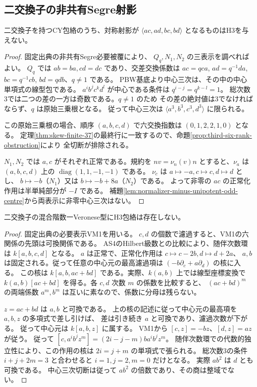 \subsection{二交換子の非共有Segre射影}
\begin{proposition}\label{prop:cubic-CY-two-disjoint-Segre-empty}
二交換子を持つCY包絡のうち、対称射影が
$\langle ac,ad,bc,bd\rangle$ となるものはH3を与えない。
\end{proposition}
\begin{proof}
固定出典\cite{AS4CYpinned}の非共有Segre必要被覆により、
$Q_q,N_1,N_2$ の三表示を調べればよい。
$Q_q$ では $ab=ba,cd=dc$ であり、交差交換係数は
$ac=qca$, $ad=q^{-1}da$, $bc=q^{-1}cb$, $bd=qdb$、$q\ne1$ である。
PBW基底より中心三次は、その中の中心単項式の線型包である。
$a^i b^j c^k d^l$ が中心である条件は $q^{i-j}=q^{k-l}=1$。
総次数3では二つの差の一方は奇数である。$q\ne1$ のため
その差の絶対値は3でなければならず、$q$ は原始三乗根となる。
従って中心三次は $\langle a^3,b^3,c^3,d^3\rangle$ に限られる。

この原始三乗根の場合、順序 $(a,b,c,d)$ で六交換指数は
$(0,1,2,2,1,0)$ となる。
定理\ref{thm:skew-finite-37}の最終行に一致するので、命題\ref{prop:third-six-rank-obstruction}により
全切断が排除される。

$N_1,N_2$ では $a,c$ がそれぞれ正常である。規約を
$nv=\nu_n(v)n$ とすると、$\nu_a$ は $(a,b,c,d)$ 上の
$\operatorname{diag}(1,1,-1,-1)$ である。
$\nu_c$ は $a\mapsto-a,c\mapsto c,d\mapsto d$ とし、
$b\mapsto-b$（$N_1$）又は $b\mapsto-b+8a$（$N_2$）である。
よって非零の $ac$ の正常化作用は半単純部分が $-I$ である。
補題\ref{lem:normalizer-minus-unipotent-odd-centre}から両表示に非零中心三次はない。
\end{proof}

\begin{proposition}\label{prop:cubic-CY-two-veronese-one-empty}
二交換子の混合階数一Veronese型にH3包絡は存在しない。
\end{proposition}
\begin{proof}
固定出典\cite{AS4CYpinned}の必要表示VM1を用いる。
$c,d$ の個数で濾過すると、VM1の六関係の先頭は可換関係である。
AS4のHilbert級数との比較により、随伴次数環は $k[a,b,c,d]$ となる。
$a$ は正常で、正常化作用は $c\mapsto c-2b,d\mapsto d+2a$、
$a,b$ は固定される。従って任意の中心元の最高濾過項は
$(-b\partial_c+a\partial_d)$ の核に入る。
この核は $k[a,b,ac+bd]$ である。実際、$k(a,b)$ 上では線型座標変換で
$k(a,b)[ac+bd]$ を得る。各 $c,d$ 次数 $m$ の係数を比較すると、
$(ac+bd)^m$ の両端係数 $a^m,b^m$ は互いに素なので、係数に分母は残らない。

$z=ac+bd$ は $a,b$ と可換である。
上の核の記述に従って中心元の最高項を $a,b,z$ の多項式で差し引けば、
差は引き続き $a$ と可換であり、濾過次数が下がる。
従って中心元は $k[a,b,z]$ に属する。
VM1から $[c,z]=-bz$、$[d,z]=az$ が従う。
従って $[c,a^ib^jz^m]=(2i-j-m)b a^ib^jz^m$。
随伴次数環での代数的独立性により、この作用の核は
$2i=j+m$ の単項式で張られる。
総次数3の条件 $i+j+2m=3$ と合わせると $i=1,j=2,m=0$ だけとなる。
実際 $ab^2$ は $d$ とも可換である。
中心三次切断は従って $ab^2$ の倍数であり、その商は整域でない。
\end{proof}

